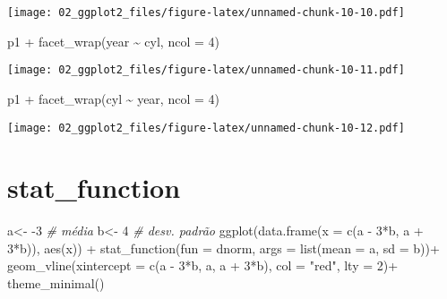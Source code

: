 \documentclass[
]{book}
\newenvironment{Shaded}{\begin{snugshade}}{\end{snugshade}}
\newcommand{\AttributeTok}[1]{\textcolor[rgb]{0.77,0.63,0.00}{#1}}
\newcommand{\CommentTok}[1]{\textcolor[rgb]{0.56,0.35,0.01}{\textit{#1}}}
\newcommand{\DecValTok}[1]{\textcolor[rgb]{0.00,0.00,0.81}{#1}}
\newcommand{\FunctionTok}[1]{\textcolor[rgb]{0.00,0.00,0.00}{#1}}
\newcommand{\NormalTok}[1]{#1}
\newcommand{\OtherTok}[1]{\textcolor[rgb]{0.56,0.35,0.01}{#1}}
\newcommand{\SpecialCharTok}[1]{\textcolor[rgb]{0.00,0.00,0.00}{#1}}
\newcommand{\StringTok}[1]{\textcolor[rgb]{0.31,0.60,0.02}{#1}}
\begin{document}
\texttt{[image: 02\_ggplot2\_files/figure-latex/unnamed-chunk-10-10.pdf]}

\begin{Shaded}
\begin{Highlighting}[]
\NormalTok{p1 }\SpecialCharTok{+} \FunctionTok{facet\_wrap}\NormalTok{(year }\SpecialCharTok{\textasciitilde{}}\NormalTok{ cyl, }\AttributeTok{ncol =} \DecValTok{4}\NormalTok{)}
\end{Highlighting}
\end{Shaded}

\texttt{[image: 02\_ggplot2\_files/figure-latex/unnamed-chunk-10-11.pdf]}

\begin{Shaded}
\begin{Highlighting}[]
\NormalTok{p1 }\SpecialCharTok{+} \FunctionTok{facet\_wrap}\NormalTok{(cyl }\SpecialCharTok{\textasciitilde{}}\NormalTok{ year, }\AttributeTok{ncol =} \DecValTok{4}\NormalTok{)}
\end{Highlighting}
\end{Shaded}

\texttt{[image: 02\_ggplot2\_files/figure-latex/unnamed-chunk-10-12.pdf]}

\hypertarget{stat_function}{%
\section{stat\_function}\label{stat_function}}

\begin{Shaded}
\begin{Highlighting}[]
\NormalTok{a}\OtherTok{\textless{}{-}} \SpecialCharTok{{-}}\DecValTok{3} \CommentTok{\# média}
\NormalTok{b}\OtherTok{\textless{}{-}} \DecValTok{4}  \CommentTok{\# desv. padrão}
\FunctionTok{ggplot}\NormalTok{(}\FunctionTok{data.frame}\NormalTok{(}\AttributeTok{x =} \FunctionTok{c}\NormalTok{(a }\SpecialCharTok{{-}} \DecValTok{3}\SpecialCharTok{*}\NormalTok{b, a }\SpecialCharTok{+} \DecValTok{3}\SpecialCharTok{*}\NormalTok{b)), }\FunctionTok{aes}\NormalTok{(x)) }\SpecialCharTok{+} 
  \FunctionTok{stat\_function}\NormalTok{(}\AttributeTok{fun =}\NormalTok{ dnorm, }\AttributeTok{args =} \FunctionTok{list}\NormalTok{(}\AttributeTok{mean =}\NormalTok{ a, }\AttributeTok{sd =}\NormalTok{ b))}\SpecialCharTok{+}
  \FunctionTok{geom\_vline}\NormalTok{(}\AttributeTok{xintercept =} \FunctionTok{c}\NormalTok{(a }\SpecialCharTok{{-}} \DecValTok{3}\SpecialCharTok{*}\NormalTok{b, a, a }\SpecialCharTok{+} \DecValTok{3}\SpecialCharTok{*}\NormalTok{b), }\AttributeTok{col =} \StringTok{"red"}\NormalTok{, }\AttributeTok{lty =} \DecValTok{2}\NormalTok{)}\SpecialCharTok{+}
  \FunctionTok{theme\_minimal}\NormalTok{()}
\end{Highlighting}
\end{Shaded}
\end{document}
